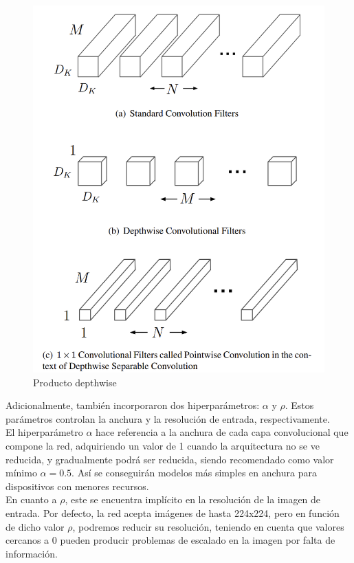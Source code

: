 \begin{figure}[H]
	\centering
	\includegraphics[scale = 0.225]{imagenes/depthwise.png}
	\caption{Producto depthwise \cite{howard2017mobilenets}}
	\label{fig:depthwise}
\end{figure}

Adicionalmente, también incorporaron dos hiperparámetros: $\alpha$ y $\rho$. Estos parámetros controlan la anchura y la resolución de entrada, respectivamente.\\
El hiperparámetro $\alpha$ hace referencia a la anchura de cada capa convolucional que compone la red, adquiriendo un valor de 1 cuando la arquitectura no se ve reducida, y gradualmente podrá ser reducida, siendo recomendado como valor mínimo $\alpha=0.5$. Así se conseguirán modelos más simples en anchura para dispositivos con menores recursos.\\

En cuanto a $\rho$, este se encuentra implícito en la resolución de la imagen de entrada. Por defecto, la red acepta imágenes de hasta 224x224, pero en función de dicho valor $\rho$, podremos reducir su resolución, teniendo en cuenta que valores cercanos a 0 pueden producir problemas de escalado en la imagen por falta de información.\\

